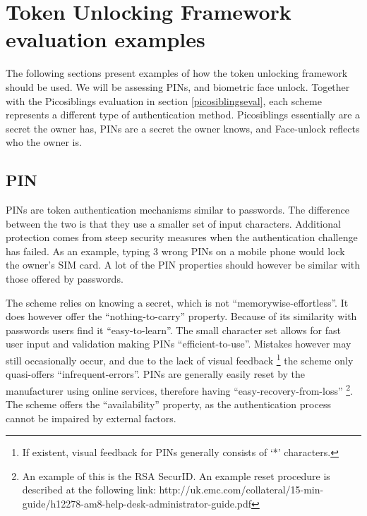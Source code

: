 
\chapter{Token Unlocking Framework evaluation examples} %

\label{AppendixA} %


The following sections present examples of how the token unlocking framework should be used. We will be assessing PINs, and biometric face unlock. Together with the Picosiblings evaluation in section \ref{picosiblingseval}, each scheme represents a different type of authentication method. Picosiblings essentially are a secret the owner has, PINs are a secret the owner knows, and Face-unlock reflects who the owner is. 

%
%
\section{PIN}
PINs are token authentication mechanisms similar to passwords. The difference between the two is that they use a smaller set of input characters. Additional protection comes from steep security measures when the authentication challenge has failed. As an example, typing 3 wrong PINs on a mobile phone would lock the owner's SIM card. A lot of the PIN properties should however be similar with those offered by passwords.
	
The scheme relies on knowing a secret, which is not ``memorywise-effortless''. It does however offer the ``nothing-to-carry'' property. Because of its similarity with passwords users find it ``easy-to-learn''. The small character set allows for fast user input and validation making PINs ``efficient-to-use''. Mistakes however may still occasionally occur, and due to the lack of visual feedback \footnote{If existent, visual feedback for PINs generally consists of `*' characters.} the scheme only quasi-offers ``infrequent-errors''. PINs are generally easily reset by the manufacturer using online services, therefore having ``easy-recovery-from-loss'' \footnote{An example of this is the RSA SecurID. An example reset procedure is described at the following link: http://uk.emc.com/collateral/15-min-guide/h12278-am8-help-desk-administrator-guide.pdf}. The scheme offers the ``availability'' property, as the authentication process cannot be impaired by external factors.
	
